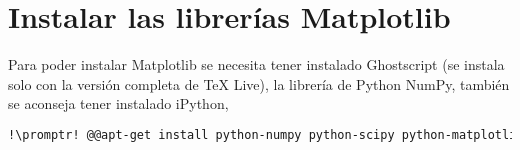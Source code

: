 \section{Instalar las librerías Matplotlib}\label{sec:matplotlib}
Para poder instalar Matplotlib se necesita tener instalado Ghostscript (se instala solo con la versión completa
de \TeX{} Live), la librería de Python NumPy, también se aconseja tener instalado iPython,

\begin{lstlisting}[gobble=2,language=bash,style=bashinteract,escapechar=!]
  !\promptr! @@apt-get install python-numpy python-scipy python-matplotlib python-pandas python-sympy python-nose@@
\end{lstlisting}
